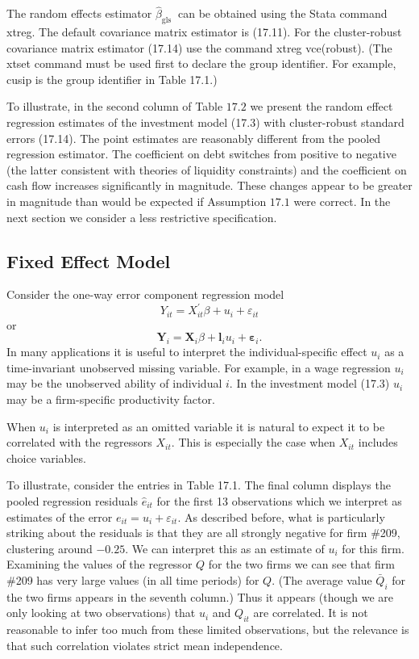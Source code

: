 \documentclass[10pt]{article}
\begin{document}
The random effects estimator $\widehat{\beta}_{\text {gls }}$ can be obtained using the Stata command xtreg. The default covariance matrix estimator is (17.11). For the cluster-robust covariance matrix estimator (17.14) use the command xtreg vce(robust). (The xtset command must be used first to declare the group identifier. For example, cusip is the group identifier in Table 17.1.)

To illustrate, in the second column of Table $17.2$ we present the random effect regression estimates of the investment model (17.3) with cluster-robust standard errors (17.14). The point estimates are reasonably different from the pooled regression estimator. The coefficient on debt switches from positive to negative (the latter consistent with theories of liquidity constraints) and the coefficient on cash flow increases significantly in magnitude. These changes appear to be greater in magnitude than would be expected if Assumption $17.1$ were correct. In the next section we consider a less restrictive specification.

\subsection{Fixed Effect Model}
Consider the one-way error component regression model
$$
Y_{i t}=X_{i t}^{\prime} \beta+u_{i}+\varepsilon_{i t}
$$
or
$$
\boldsymbol{Y}_{i}=\boldsymbol{X}_{i} \beta+\mathbf{l}_{i} u_{i}+\boldsymbol{\varepsilon}_{i} .
$$
In many applications it is useful to interpret the individual-specific effect $u_{i}$ as a time-invariant unobserved missing variable. For example, in a wage regression $u_{i}$ may be the unobserved ability of individual $i$. In the investment model (17.3) $u_{i}$ may be a firm-specific productivity factor.

When $u_{i}$ is interpreted as an omitted variable it is natural to expect it to be correlated with the regressors $X_{i t}$. This is especially the case when $X_{i t}$ includes choice variables.

To illustrate, consider the entries in Table 17.1. The final column displays the pooled regression residuals $\widehat{e}_{i t}$ for the first 13 observations which we interpret as estimates of the error $e_{i t}=u_{i}+\varepsilon_{i t}$. As described before, what is particularly striking about the residuals is that they are all strongly negative for firm \#209, clustering around $-0.25$. We can interpret this as an estimate of $u_{i}$ for this firm. Examining the values of the regressor $Q$ for the two firms we can see that firm \#209 has very large values (in all time periods) for $Q$. (The average value $\bar{Q}_{i}$ for the two firms appears in the seventh column.) Thus it appears (though we are only looking at two observations) that $u_{i}$ and $Q_{i t}$ are correlated. It is not reasonable to infer too much from these limited observations, but the relevance is that such correlation violates strict mean independence.
\end{document}
